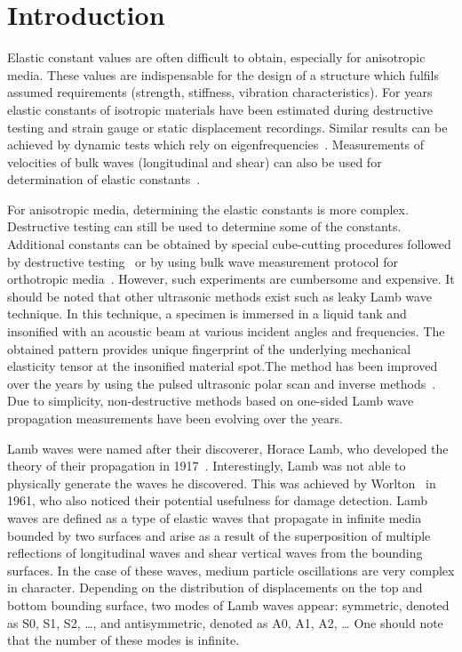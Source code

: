 \documentclass[preprint,12pt]{elsarticle}
\begin{document}
	
	\section{Introduction}
	Elastic constant values are often difficult to obtain, especially for anisotropic media. These values are indispensable for the design of a structure which fulfils assumed requirements (strength, stiffness, vibration characteristics). For years elastic constants of isotropic materials have been estimated during destructive testing and strain gauge or static displacement recordings. Similar results can be achieved by dynamic tests which rely on eigenfrequencies~\cite{Beluch2014}. Measurements of velocities of bulk waves (longitudinal and shear) can also be used for determination of elastic constants~\cite{Rose1999}.
	
	For anisotropic media, determining the elastic constants is more complex. Destructive testing can still be used to determine some of the constants. Additional constants can be obtained by special cube-cutting procedures followed by destructive testing~\cite{Rose1991} or by using bulk wave measurement protocol for orthotropic media~\cite{Rose1999}. However, such experiments are cumbersome and expensive.  It should be noted that other ultrasonic methods exist such as leaky Lamb wave technique. In this technique, a specimen is immersed in a liquid tank and insonified with an acoustic beam at various incident angles and frequencies. The obtained pattern provides unique fingerprint of the underlying mechanical elasticity tensor at the insonified material spot.The method has been improved over the years by using the pulsed ultrasonic polar scan and inverse methods~\cite{Kersemans2014}. Due to simplicity, non-destructive methods based on one-sided Lamb wave propagation measurements have been evolving over the years.
	
	Lamb waves were named after their discoverer, Horace Lamb, who developed the theory of their propagation in 1917~\cite{Lamb1917}. Interestingly, Lamb was not able to physically generate the waves he discovered. This was achieved by Worlton~\cite{Worlton1961} in 1961, who also noticed their potential usefulness for damage detection. Lamb waves are defined as a type of elastic waves that propagate in infinite media bounded by two surfaces and arise as a result of the superposition of multiple reflections of longitudinal waves and shear vertical waves from the bounding surfaces. In the case of these waves, medium particle oscillations are very complex in character. Depending on the distribution of displacements on the top and bottom bounding surface, two modes of Lamb waves appear: symmetric, denoted as S0, S1, S2, …, and antisymmetric, denoted as A0, A1, A2, … One should note that the number of these modes is infinite.
	
\end{document}
